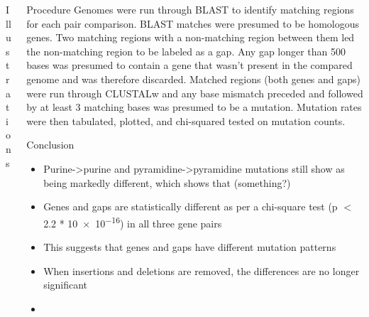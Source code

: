 \documentclass[final]{beamer}
\begin{document}
\begin{frame}{}
\begin{columns}[t]
\begin{column}{.32 \linewidth}
\begin{block}{\large Illustrations}
\end{block}


\end{column}




\begin{column}{.32 \linewidth}

\begin{block}{Procedure}
Genomes were run through BLAST to identify matching regions for each pair comparison. BLAST matches were presumed to be homologous genes. Two matching regions with a non-matching region between them led the non-matching region to be labeled as a gap. Any gap longer than 500 bases was presumed to contain a gene that wasn't present in the compared genome and was therefore discarded.
\newline
Matched regions (both genes and gaps) were run through CLUSTALw and any base mismatch preceded and followed by at least 3 matching bases was presumed to be a mutation. Mutation rates were then tabulated, plotted, and chi-squared tested on mutation counts.
\end{block}
\begin{block}{\large Conclusion}
\begin{itemize}
	\item Purine->purine and pyramidine->pyramidine mutations still show as being markedly different, which shows that (something?)
	\item 
	Genes and gaps are statistically different as per a chi-square test (p $<$ \num{2.2} * \num{10e-16}) in all three gene pairs
	\item This suggests that genes and gaps have different mutation patterns
	\item When insertions and deletions are removed, the differences are no longer significant
	\item 
\end{itemize}



\end{block}


	

\end{column}
\end{columns}
\end{frame}
\end{document}
